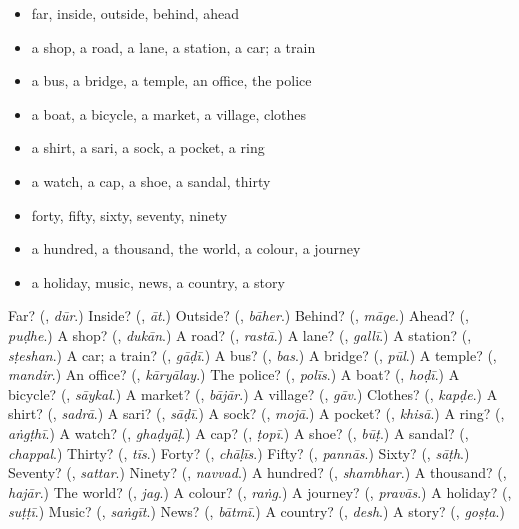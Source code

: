\begin{itemize}
\raggedright
  \item far, inside, outside, behind, ahead
  \item a shop, a road, a lane, a station, a car; a train
  \item a bus, a bridge, a temple, an office, the police
  \item a boat, a bicycle, a market, a village, clothes
  \item a shirt, a sari, a sock, a pocket, a ring
  \item a watch, a cap, a shoe, a sandal, thirty
  \item forty, fifty, sixty, seventy, ninety
  \item a hundred, a thousand, the world, a colour, a journey
  \item a holiday, music, news, a country, a story
\end{itemize}

\begin{tcolorbox}[breakable,colback=teal!4,colframe=teal!35!black,title={Before you move on}]
Far? (\textbf{}, \emph{dūr}.) Inside? (\textbf{}, \emph{āt}.) Outside? (\textbf{}, \emph{bāher}.) Behind? (\textbf{}, \emph{māge}.) Ahead? (\textbf{}, \emph{puḍhe}.) A shop? (\textbf{}, \emph{dukān}.) A road? (\textbf{}, \emph{rastā}.) A lane? (\textbf{}, \emph{gallī}.) A station? (\textbf{}, \emph{sṭeshan}.) A car; a train? (\textbf{}, \emph{gāḍī}.) A bus? (\textbf{}, \emph{bas}.) A bridge? (\textbf{}, \emph{pūl}.) A temple? (\textbf{}, \emph{mandir}.) An office? (\textbf{}, \emph{kāryālay}.) The police? (\textbf{}, \emph{polīs}.) A boat? (\textbf{}, \emph{hoḍī}.) A bicycle? (\textbf{}, \emph{sāykal}.) A market? (\textbf{}, \emph{bājār}.) A village? (\textbf{}, \emph{gāv}.) Clothes? (\textbf{}, \emph{kapḍe}.) A shirt? (\textbf{}, \emph{sadrā}.) A sari? (\textbf{}, \emph{sāḍī}.) A sock? (\textbf{}, \emph{mojā}.) A pocket? (\textbf{}, \emph{khisā}.) A ring? (\textbf{}, \emph{aṅgṭhī}.) A watch? (\textbf{}, \emph{ghaḍyāḷ}.) A cap? (\textbf{}, \emph{ṭopī}.) A shoe? (\textbf{}, \emph{būṭ}.) A sandal? (\textbf{}, \emph{chappal}.) Thirty? (\textbf{}, \emph{tīs}.) Forty? (\textbf{}, \emph{chāḷīs}.) Fifty? (\textbf{}, \emph{pannās}.) Sixty? (\textbf{}, \emph{sāṭh}.) Seventy? (\textbf{}, \emph{sattar}.) Ninety? (\textbf{}, \emph{navvad}.) A hundred? (\textbf{}, \emph{shambhar}.) A thousand? (\textbf{}, \emph{hajār}.) The world? (\textbf{}, \emph{jag}.) A colour? (\textbf{}, \emph{raṅg}.) A journey? (\textbf{}, \emph{pravās}.) A holiday? (\textbf{}, \emph{suṭṭī}.) Music? (\textbf{}, \emph{saṅgīt}.) News? (\textbf{}, \emph{bātmī}.) A country? (\textbf{}, \emph{desh}.) A story? (\textbf{}, \emph{goṣṭa}.)
\end{tcolorbox}
